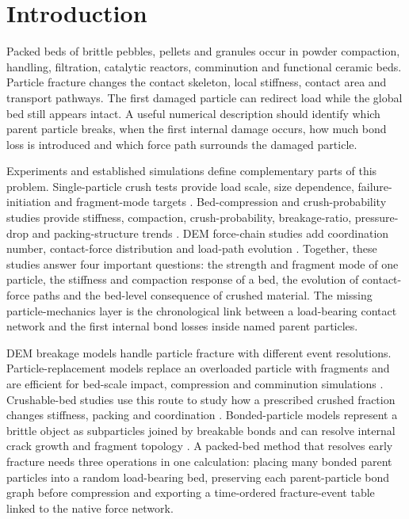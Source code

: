 \documentclass[preprint,12pt]{elsarticle}
\begin{document}
\section{Introduction}

Packed beds of brittle pebbles, pellets and granules occur in powder compaction, handling, filtration, catalytic reactors, comminution and functional ceramic beds. Particle fracture changes the contact skeleton, local stiffness, contact area and transport pathways. The first damaged particle can redirect load while the global bed still appears intact. A useful numerical description should identify which parent particle breaks, when the first internal damage occurs, how much bond loss is introduced and which force path surrounds the damaged particle.


Experiments and established simulations define complementary parts of this problem. Single-particle crush tests provide load scale, size dependence, failure-initiation and fragment-mode targets \cite{PlateMaterialLi4SiO4,Zhao2013FailureInitiationLi4SiO4,Annabattula2014SizeDependentCrush,Bhartia2020ElasticResponse,Tavares2022SingleParticleBreakageReview}. Bed-compression and crush-probability studies provide stiffness, compaction, crush-probability, breakage-ratio, pressure-drop and packing-structure trends \cite{ZaccariLoFrano2009CeramicPebbleBeds,PreliminaryLi4SiO4StructuralPerformance,CrushProbabilityPebbleBed2011,CrushedPebblePressureDrop2024,Fang2026Li4SiO4BedCrushing}. DEM force-chain studies add coordination number, contact-force distribution and load-path evolution \cite{An2007DEMCeramicBreederBeds,GanKamlah2010DEMPebbleBeds,Wang2024ForceChainPebbleBed}. Together, these studies answer four important questions: the strength and fragment mode of one particle, the stiffness and compaction response of a bed, the evolution of contact-force paths and the bed-level consequence of crushed material. The missing particle-mechanics layer is the chronological link between a load-bearing contact network and the first internal bond losses inside named parent particles.


DEM breakage models handle particle fracture with different event resolutions. Particle-replacement models replace an overloaded particle with fragments and are efficient for bed-scale impact, compression and comminution simulations \cite{JimenezHerrera2018BreakageModels,Barrios2020ParticleBedBreakage,Zhou2020FragmentReplacementModes}. Crushable-bed studies use this route to study how a prescribed crushed fraction changes stiffness, packing and coordination \cite{Wang2021CrushableCeramicPebbleBed,CrushableDEMPebbleBed2026}. Bonded-particle models represent a brittle object as subparticles joined by breakable bonds and can resolve internal crack growth and fragment topology \cite{PotyondyCundall2004}. A packed-bed method that resolves early fracture needs three operations in one calculation: placing many bonded parent particles into a random load-bearing bed, preserving each parent-particle bond graph before compression and exporting a time-ordered fracture-event table linked to the native force network.
\end{document}
